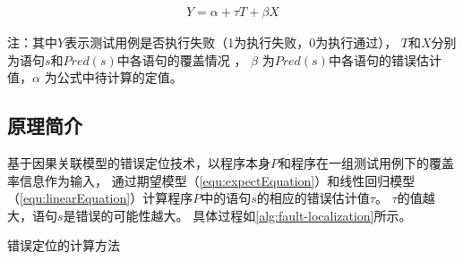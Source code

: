 \begin{equation}
\begin{aligned}
Y =\alpha +\tau T+\beta X 
\end{aligned}
\label{equ:linearEquation} 
\end{equation}
\begin{scriptsize}
	注：其中$Y$表示测试用例是否执行失败（1为执行失败，0为执行通过），
	$T$和$X$分别为语句$s$和$Pred(s)$中各语句的覆盖情况 ，
	$\beta$ 为$Pred(s)$中各语句的错误估计值，$\alpha$ 为公式中待计算的定值。  \par
	
\end{scriptsize}

\subsection{原理简介}



基于因果关联模型的错误定位技术，以程序本身$P$和程序在一组测试用例下的覆盖率信息作为输入，
通过期望模型（\autoref{equ:expectEquation}）和线性回归模型（\autoref{equ:linearEquation}）计算程序$P$中的语句$s$的相应的错误估计值$\tau$。
$\tau$的值越大，语句$s$是错误的可能性越大。
具体过程如\autoref{alg:fault-localization}所示。


\begin{algorithm}[hb]
	
\tablewuhao

\caption{错误定位的计算方法} 


\label{alg:fault-localization}




\end{algorithm}






